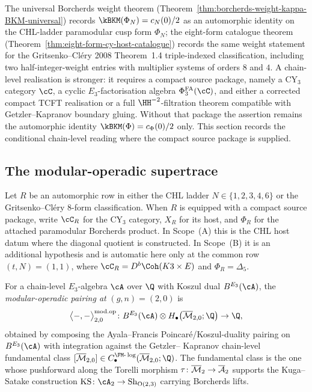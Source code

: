 The universal Borcherds weight theorem
\textup{(Theorem~\ref{thm:borcherds-weight-kappa-BKM-universal})}
records $\kBKM(\Phi_N) = c_N(0)/2$ as an automorphic identity on the
CHL-ladder paramodular cusp form $\Phi_N$; the eight-form catalogue
theorem \textup{(Theorem~\ref{thm:eight-form-cy-host-catalogue})}
records the same weight statement for the Gritsenko--Cl\'ery 2008
Theorem~1.4 triple-indexed classification, including two
half-integer-weight entries with multiplier systems of orders $8$ and
$4$. A chain-level realisation is stronger: it requires a compact
source package, namely a CY$_3$ category $\cC$, a cyclic
$E_3$-factorisation algebra $\PhiFA_3(\cC)$, and either a corrected
compact TCFT realisation or a full $\HH^{-2}$-filtration theorem
compatible with Getzler--Kapranov boundary gluing. Without that package
the assertion remains the automorphic identity $\kBKM(\Phi)=c_\Phi(0)/2$ only.
This section records the conditional chain-level reading where the
compact source package is supplied.

\subsection{The modular-operadic supertrace}
\label{subsec:mod-op-supertrace}

Let $R$ be an automorphic row in either the CHL ladder
$N \in \{1, 2, 3, 4, 6\}$ or the Gritsenko--Cl\'ery $8$-form
classification. When $R$ is equipped with a compact source package, write
$\cC_R$ for the CY$_3$ category, $X_R$ for its host, and
$\Phi_R$ for the attached paramodular Borcherds product. In Scope~(A)
this is the CHL host datum where the diagonal quotient is constructed.
In Scope~(B) it is an additional hypothesis and is automatic here only
at the common row $(t,N)=(1,1)$, where
$\cC_R=D^b\Coh(K3\times E)$ and $\Phi_R=\Delta_5$.

\begin{definition}
\label{def:modular-operadic-pairing-chapter}
For a chain-level $E_3$-algebra $\cA$ over $\Q$ with Koszul dual
$B^{E_3}(\cA)$, the \emph{modular-operadic pairing at} $(g, n) =
(2, 0)$ is
\[
 \bigl\langle -, - \bigr\rangle^{\modop}_{2, 0}
 \colon
 B^{E_3}(\cA) \otimes H_\bullet\bigl(\Mbar_{2, 0}; \Q\bigr) \to \Q,
\]
obtained by composing the Ayala--Francis Poincar\'e/Koszul-duality
pairing on $B^{E_3}(\cA)$ with integration against the Getzler--
Kapranov chain-level fundamental class $[\Mbar_{2, 0}] \in
C_\bullet^{\FM\text{-}\log}(\Mbar_{2, 0}; \Q)$. The fundamental class
is the one whose pushforward along the Torelli morphism
$\tau \colon \overline{\mathcal{M}}_2 \to \overline{\mathcal{A}}_2$ supports the Kuga--Satake
construction $\KS \colon \cA_2 \to \mathrm{Sh}_{\mathrm{O}(2, 3)}$
carrying Borcherds lifts.
\end{definition}


